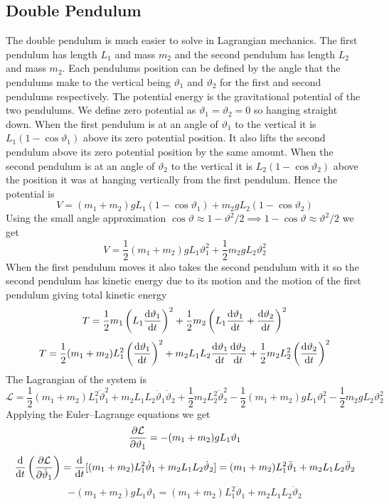 \documentclass{article}
\newcommand{\LL}{\mathcal{L}}
\begin{document}
    \subsection{Double Pendulum}
    The double pendulum is much easier to solve in Lagrangian mechanics.
    The first pendulum has length \(L_1\) and mass \(m_2\) and the second pendulum has length \(L_2\) and mass \(m_2\).
    Each pendulums position can be defined by the angle that the pendulums make to the vertical being \(\vartheta_1\) and \(\vartheta_2\) for the first and second pendulums respectively.
    The potential energy is the gravitational potential of the two pendulums.
    We define zero potential as \(\vartheta_1 = \vartheta_2 = 0\) so hanging straight down.
    When the first pendulum is at an angle of \(\vartheta_1\) to the vertical it is \(L_1(1 - \cos\vartheta_1)\) above its zero potential position.
    It also lifts the second pendulum above its zero potential position by the same amount.
    When the second pendulum is at an angle of \(\vartheta_2\) to the vertical it is \(L_2(1 - \cos\vartheta_2)\) above the position it was at hanging vertically from the first pendulum.
    Hence the potential is
    \[V = (m_1 + m_2)gL_1(1 - \cos\vartheta_1) + m_2gL_2(1 - \cos\vartheta_2)\]
    Using the small angle approximation \(\cos\vartheta \approx 1 - \vartheta^2/2\implies 1 - \cos\vartheta\approx \vartheta^2/2\) we get
    \[V = \frac{1}{2}(m_1 + m_2)gL_1\vartheta_1^2 + \frac{1}{2}m_2gL_2\vartheta_2^2\]
    When the first pendulum moves it also takes the second pendulum with it so the second pendulum has kinetic energy due to its motion and the motion of the first pendulum giving total kinetic energy
    \[T = \frac{1}{2}m_1\left(L_1\dv{\vartheta_1}{t}\right)^2 + \frac{1}{2}m_2\left(L_1\dv{\vartheta_1}{t} + \dv{\vartheta_2}{t}\right)^2\]
    \[T = \frac{1}{2}(m_1 + m_2)L_1^2\left(\dv{\vartheta_1}{t}\right)^2 + m_2L_1L_2\dv{\vartheta_1}{t}\dv{\vartheta_2}{t} + \frac{1}{2}m_2L_2^2\left(\dv{\vartheta_2}{t}\right)^2\]
    The Lagrangian of the system is
    \[\LL = \frac{1}{2}(m_1 + m_2)L_1^2\dot\vartheta_1^2 + m_2L_1L_2\dot\vartheta_1\dot\vartheta_2 + \frac{1}{2}m_2L_2^2\dot\vartheta_2^2 - \frac{1}{2}(m_1 + m_2)gL_1\vartheta_1^2 - \frac{1}{2}m_2gL_2\vartheta_2^2\]
    Applying the Euler--Lagrange equations we get
    \[\pdv{\LL}{\vartheta_1} = -(m_1 + m_2)gL_1\vartheta_1\]
    \[\dv{t}\left(\pdv{\LL}{\dot\vartheta_1}\right) = \dv{t}[(m_1 + m_2)L_1^2\dot\vartheta_1 + m_2L_1L_2\dot\vartheta_2] = (m_1 + m_2)L_1^2\ddot\vartheta_1 + m_2L_1L_2\ddot\vartheta_2\]
    \[-(m_1 + m_2)gL_1\vartheta_1 = (m_1 + m_2)L_1^2\ddot\vartheta_1 + m_2L_1L_2\ddot\vartheta_2\]
\end{document}
